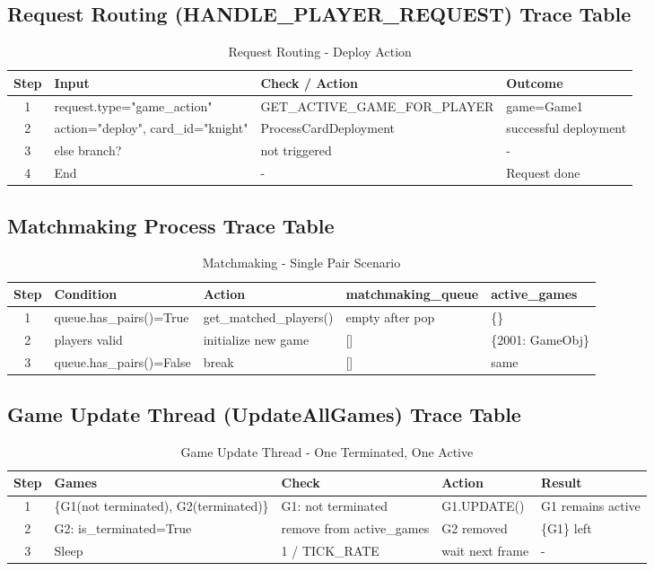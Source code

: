 \documentclass{article}
\begin{document}
\subsection{Request Routing (HANDLE\_PLAYER\_REQUEST) Trace Table}
\begin{table}[H]
\centering
\footnotesize
\begin{tabular}{|c|p{3.5cm}|p{4cm}|p{2.5cm}|}
\hline
\textbf{Step} & \textbf{Input} & \textbf{Check / Action} & \textbf{Outcome}\\
\hline
1 & request.type="game\_action" & GET\_ACTIVE\_GAME\_FOR\_PLAYER & game=Game1 \\
\hline
2 & action="deploy", card\_id="knight" & ProcessCardDeployment & successful deployment \\
\hline
3 & else branch? & not triggered & - \\
\hline
4 & End & - & Request done \\
\hline
\end{tabular}
\caption{Request Routing - Deploy Action}
\end{table}

\subsection{Matchmaking Process Trace Table}
\begin{table}[H]
\centering
\footnotesize
\begin{tabular}{|c|p{3.5cm}|p{4cm}|p{2.5cm}|p{2.5cm}|}
\hline
\textbf{Step} & \textbf{Condition} & \textbf{Action} & \textbf{matchmaking\_queue} & \textbf{active\_games} \\
\hline
1 & queue.has\_pairs()=True & get\_matched\_players() & empty after pop & \{\} \\
\hline
2 & players valid & initialize new game & [] & \{2001: GameObj\} \\
\hline
3 & queue.has\_pairs()=False & break & [] & same \\
\hline
\end{tabular}
\caption{Matchmaking - Single Pair Scenario}
\end{table}

\subsection{Game Update Thread (UpdateAllGames) Trace Table}
\begin{table}[H]
\centering
\footnotesize
\begin{tabular}{|c|p{3.5cm}|p{3.5cm}|p{3cm}|p{3cm}|}
\hline
\textbf{Step} & \textbf{Games} & \textbf{Check} & \textbf{Action} & \textbf{Result}\\
\hline
1 & \{G1(not terminated), G2(terminated)\} & G1: not terminated & G1.UPDATE() & G1 remains active \\
\hline
2 & G2: is\_terminated=True & remove from active\_games & G2 removed & \{G1\} left \\
\hline
3 & Sleep & 1 / TICK\_RATE & wait next frame & - \\
\hline
\end{tabular}
\caption{Game Update Thread - One Terminated, One Active}
\end{table}
\end{document}
